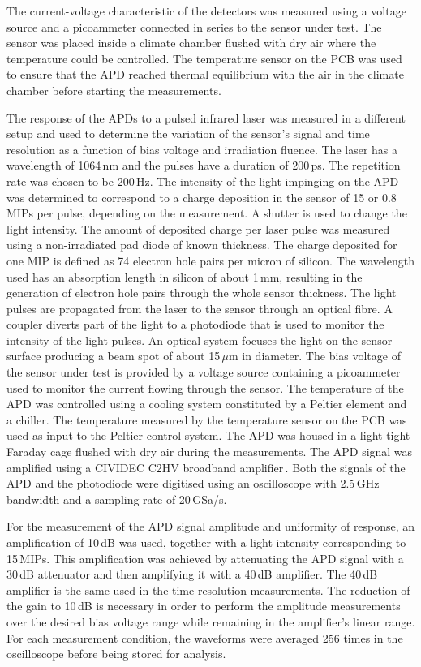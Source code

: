 \documentclass{article}
\begin{document}
The current-voltage characteristic of the detectors was measured using a voltage source and a picoammeter connected in series to the sensor under test.
The sensor was placed inside a climate chamber flushed with dry air where the temperature could be controlled.
The temperature sensor on the PCB was used to ensure that the APD reached thermal equilibrium with the air in the climate chamber before starting the measurements.

The response of the APDs to a pulsed infrared laser was measured in a different setup and used to determine the variation of the sensor's signal and time resolution as a function of bias voltage and irradiation fluence.
The laser has a wavelength of 1064\,nm and the pulses have a duration of 200\,ps.
The repetition rate was chosen to be 200\,Hz.
The intensity of the light impinging on the APD was determined to correspond to a charge deposition in the sensor of 15 or 0.8\,MIPs per pulse, depending on the measurement.
A shutter is used to change the light intensity.
The amount of deposited charge per laser pulse was measured using a non-irradiated pad diode of known thickness.
The charge deposited for one MIP is defined as 74 electron hole pairs per micron of silicon.
The wavelength used has an absorption length in silicon of about 1\,mm, resulting in the generation of electron hole pairs through the whole sensor thickness.
The light pulses are propagated from the laser to the sensor through an optical fibre.
A coupler diverts part of the light to a photodiode that is used to monitor the intensity of the light pulses.
An optical system focuses the light on the sensor surface producing a beam spot of about 15\,$\mu$m in diameter.
The bias voltage of the sensor under test is provided by a voltage source containing a picoammeter used to monitor the current flowing through the sensor.
The temperature of the APD was controlled using a cooling system constituted by a Peltier element and a chiller.
The temperature measured by the temperature sensor on the PCB was used as input to the Peltier control system.
The APD was housed in a light-tight Faraday cage flushed with dry air during the measurements.
The APD signal was amplified using a CIVIDEC C2HV broadband amplifier\,\cite{cividec}.
Both the signals of the APD and the photodiode were digitised using an oscilloscope with 2.5\,GHz bandwidth and a sampling rate of 20\,GSa/s.

For the measurement of the APD signal amplitude and uniformity of response, an amplification of 10\,dB was used, together with a light intensity corresponding to 15\,MIPs.
This amplification was achieved by attenuating the APD signal with a 30\,dB attenuator and then amplifying it with a 40\,dB amplifier.
The 40\,dB amplifier is the same used in the time resolution measurements.
The reduction of the gain to 10\,dB is necessary in order to perform the amplitude measurements over the desired bias voltage range while remaining in the amplifier's linear range.
For each measurement condition, the waveforms were averaged 256 times in the oscilloscope before being stored for analysis.
\end{document}

